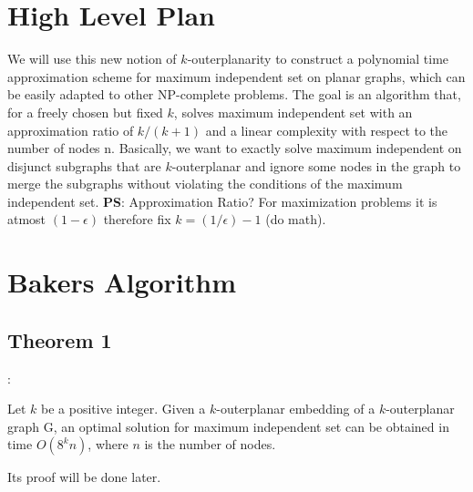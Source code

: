 \documentclass{beamer}
\begin{document}
\section{High Level Plan}
\begin{frame}{\secname}
    We will use this new notion of $k$-outerplanarity to construct a polynomial time approximation scheme for maximum independent set on planar graphs, which can be
easily adapted to other NP-complete problems. The goal
is an algorithm that, for a freely chosen but fixed $k$, solves maximum independent set with an approximation ratio
of $k / (k + 1)$ and a linear complexity with respect to the
number of nodes n.
Basically, we want to exactly solve maximum independent on disjunct subgraphs that are $k$-outerplanar and
ignore some nodes in the graph to merge the subgraphs
without violating the conditions of the maximum independent set.
\newline
\newline
\newline
\textbf{PS}: Approximation Ratio? For maximization problems it is atmost $(1 - \epsilon)$ therefore fix $k = (1/\epsilon) - 1$ (do math).
\end{frame}
\section{Bakers Algorithm}
\subsection{Theorem 1}
\begin{frame}{\secname : \subsecname}
   \begin{theorem} 
    [Baker, 1994] Let $k$ be a positive integer. Given a $k$-outerplanar embedding of a $k$-outerplanar
    graph G, an optimal solution for maximum independent
    set can be obtained in time $O(8^kn)$, where $n$ is the number of nodes.
    \end{theorem}

    Its proof will be done later.
\end{frame}
\end{document}
